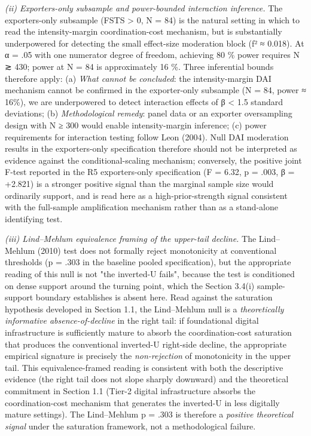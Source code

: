 \documentclass[12pt,a4paper]{article}
\begin{document}
\emph{(ii) Exporters-only subsample and power-bounded interaction
inference.} The exporters-only subsample (FSTS \textgreater{} 0, N = 84)
is the natural setting in which to read the intensity-margin
coordination-cost mechanism, but is substantially underpowered for
detecting the small effect-size moderation block (f² ≈ 0.018). At α =
.05 with one numerator degree of freedom, achieving 80 \% power requires
N ≳ 430; power at N = 84 is approximately 16 \%. Three inferential
bounds therefore apply: (a) \emph{What cannot be concluded}: the
intensity-margin DAI mechanism cannot be confirmed in the exporter-only
subsample (N = 84, power ≈ 16\%), we are underpowered to detect
interaction effects of β \textless{} 1.5 standard deviations; (b)
\emph{Methodological remedy}: panel data or an exporter oversampling
design with N ≥ 300 would enable intensity-margin inference; (c) power
requirements for interaction testing follow Leon (2004). Null DAI
moderation results in the exporters-only specification therefore should
not be interpreted as evidence against the conditional-scaling
mechanism; conversely, the positive joint F-test reported in the R5
exporters-only specification (F = 6.32, p = .003, β = +2.821) is a
stronger positive signal than the marginal sample size would ordinarily
support, and is read here as a high-prior-strength signal consistent
with the full-sample amplification mechanism rather than as a
stand-alone identifying test.

\emph{(iii) Lind--Mehlum equivalence framing of the upper-tail decline.}
The Lind--Mehlum (2010) test does not formally reject monotonicity at
conventional thresholds (p = .303 in the baseline pooled specification),
but the appropriate reading of this null is not "the inverted-U fails",
because the test is conditioned on dense support around the turning
point, which the Section 3.4(i) sample-support boundary establishes is
absent here. Read against the saturation hypothesis developed in Section
1.1, the Lind--Mehlum null is a \emph{theoretically informative
absence-of-decline} in the right tail: if foundational digital
infrastructure is sufficiently mature to absorb the coordination-cost
saturation that produces the conventional inverted-U right-side decline,
the appropriate empirical signature is precisely the
\emph{non-rejection} of monotonicity in the upper tail. This
equivalence-framed reading is consistent with both the descriptive
evidence (the right tail does not slope sharply downward) and the
theoretical commitment in Section 1.1 (Tier-2 digital infrastructure
absorbs the coordination-cost mechanism that generates the inverted-U in
less digitally mature settings). The Lind--Mehlum p = .303 is therefore
a \emph{positive theoretical signal} under the saturation framework, not
a methodological failure.
\end{document}
